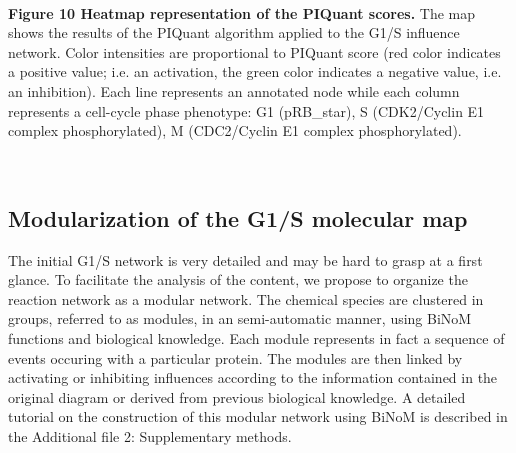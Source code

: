 \documentclass[11pt]{bmc_article_s50}
\newenvironment{bmcformat}{\begin{raggedright}\baselineskip20pt\sloppy\setboolean{publ}{false}}{\end{raggedright}\baselineskip20pt\sloppy}
\begin{document}
\begin{bmcformat}
\hrulefill\

\vspace*{-15pt}
\textbf{Figure 10 Heatmap representation of the PIQuant scores.}
The map shows the results of the PIQuant algorithm applied to the G1/S
influence network. Color intensities are proportional to PIQuant score (red color indicates a positive
value; i.e. an activation, the green color indicates a negative value, i.e. an
inhibition).
Each line represents an annotated node while each column represents a cell-cycle
phase phenotype: G1 (pRB\_star), S (CDK2/Cyclin E1 complex phosphorylated), M (CDC2/Cyclin E1 complex phosphorylated).
\vspace*{-23pt}

\hrulefill\



\subsection*{Modularization of the G1/S molecular map}

The initial G1/S network is very detailed and may be hard to grasp at a first glance.
To facilitate the analysis of the content, we propose to organize the reaction
network as a modular network. The chemical species are clustered in groups, referred to
as modules, in an semi-automatic manner, using BiNoM functions and biological
knowledge. Each module represents in fact a
sequence of events occuring with a particular protein. The modules are then
linked by activating or inhibiting influences according to the information
contained in the original diagram or derived from previous biological knowledge.
A detailed tutorial on the construction of this modular network using BiNoM is
described in the Additional file 2: Supplementary methods.


\end{bmcformat}
\end{document}

